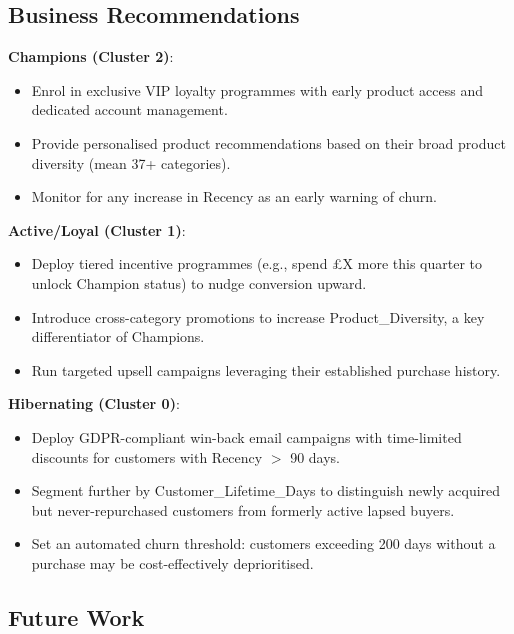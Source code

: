 \documentclass[12pt,a4paper]{article}
\begin{document}
\subsection{Business Recommendations}

\textbf{Champions (Cluster 2)}:
\begin{itemize}[leftmargin=*,noitemsep]
  \item Enrol in exclusive VIP loyalty programmes with early product access and
        dedicated account management.
  \item Provide personalised product recommendations based on their broad product
        diversity (mean 37+ categories).
  \item Monitor for any increase in Recency as an early warning of churn.
\end{itemize}

\textbf{Active/Loyal (Cluster 1)}:
\begin{itemize}[leftmargin=*,noitemsep]
  \item Deploy tiered incentive programmes (e.g., spend \pounds X more this quarter
        to unlock Champion status) to nudge conversion upward.
  \item Introduce cross-category promotions to increase Product\_Diversity, a key
        differentiator of Champions.
  \item Run targeted upsell campaigns leveraging their established purchase history.
\end{itemize}

\textbf{Hibernating (Cluster 0)}:
\begin{itemize}[leftmargin=*,noitemsep]
  \item Deploy GDPR-compliant win-back email campaigns with time-limited discounts
        for customers with Recency $>$ 90 days.
  \item Segment further by Customer\_Lifetime\_Days to distinguish newly acquired but
        never-repurchased customers from formerly active lapsed buyers.
  \item Set an automated churn threshold: customers exceeding 200 days without a
        purchase may be cost-effectively deprioritised.
\end{itemize}

\subsection{Future Work}
\end{document}
